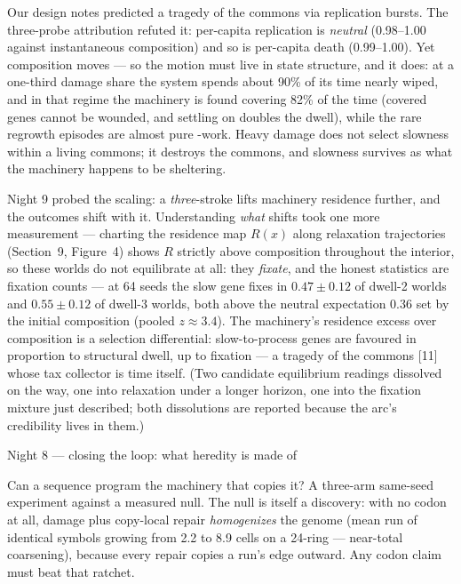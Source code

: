 Our design notes predicted a tragedy of the commons via
replication bursts. The three-probe attribution refuted it:
per-capita replication is {\it neutral} (0.98--1.00 against
instantaneous composition) and so is per-capita death
(0.99--1.00). Yet composition moves --- so the motion must live in
state structure, and it does: at a one-third damage share the
system spends about 90\% of its time nearly wiped, and in that
regime the machinery is found covering  82\% of the time
(covered genes cannot be wounded, and settling on  doubles
the dwell), while the rare regrowth episodes are almost pure
-work. Heavy damage does not select slowness within a living
commons; it destroys the commons, and slowness survives as what
the machinery happens to be sheltering.

Night 9 probed the scaling: a {\it three}-stroke  lifts
machinery residence further, and the outcomes shift with it.
Understanding {\it what} shifts took one more measurement ---
charting the residence map $R(x)$ along relaxation trajectories
(Section~9, Figure~4) shows $R$ strictly above composition
throughout the interior, so these worlds do not equilibrate at
all: they {\it fixate}, and the honest statistics are fixation
counts --- at 64 seeds the slow gene fixes in $0.47\pm0.12$ of
dwell-2 worlds and $0.55\pm0.12$ of dwell-3 worlds, both above
the neutral expectation 0.36 set by the initial composition
(pooled $z\approx3.4$).  The machinery's residence
excess over composition is a selection differential:
slow-to-process genes are favoured in proportion to structural
dwell, up to fixation --- a tragedy of the commons [11] whose tax
collector is time itself. (Two candidate equilibrium readings
dissolved on the way, one into relaxation under a longer horizon,
one into the fixation mixture just described; both dissolutions
are reported because the arc's credibility lives in them.)

\secc Night 8 --- closing the loop: what heredity is made of

Can a sequence program the machinery that copies it? A three-arm
same-seed experiment against a measured null. The null is itself a
discovery: with no codon at all, damage plus copy-local repair
{\it homogenizes} the genome (mean run of identical symbols
growing from 2.2 to 8.9 cells on a 24-ring --- near-total
coarsening), because every repair copies a run's edge outward. Any
codon claim must beat that ratchet.

